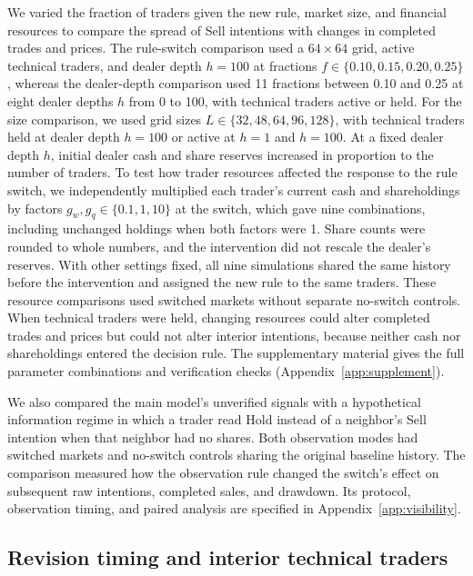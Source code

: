 We varied the fraction of traders given the new rule, market size, and
financial resources to compare the spread of Sell intentions with
changes in completed trades and prices. The rule-switch comparison used
a $64\times64$ grid, active technical traders, and dealer depth $h=100$
at fractions $f\in\{0.10,0.15,0.20,0.25\}$, whereas the dealer-depth
comparison used 11 fractions between 0.10 and 0.25 at eight dealer
depths $h$ from 0 to 100, with technical traders active or held. For the
size comparison, we used grid sizes $L\in\{32,48,64,96,128\}$, with
technical traders held at dealer depth $h=100$ or active at $h=1$ and
$h=100$. At a fixed dealer depth $h$, initial dealer cash and share
reserves increased in proportion to the number of traders. To test how
trader resources affected the response to the rule switch, we
independently multiplied each trader's current cash and shareholdings by
factors $g_w,g_q\in\{0.1,1,10\}$ at the switch, which gave nine
combinations, including unchanged holdings when both factors were 1.
Share counts were rounded to whole numbers, and the intervention did not
rescale the dealer's reserves. With other settings fixed, all nine
simulations shared the same history before the intervention and assigned
the new rule to the same traders. These resource comparisons used
switched markets without separate no-switch controls. When technical
traders were held,
changing resources could alter completed trades and prices but could not
alter interior intentions, because neither cash nor shareholdings
entered the decision rule. The supplementary material gives the full
parameter combinations and verification checks
(Appendix~\ref{app:supplement}).



We also compared the main model's unverified signals with a hypothetical
information regime in which a trader read Hold instead of a neighbor's
Sell intention when that neighbor had no shares. Both observation modes
had switched markets and no-switch controls sharing the original
baseline history. The comparison measured how the observation rule
changed the switch's effect on subsequent raw intentions, completed
sales, and drawdown. Its protocol, observation timing, and paired
analysis are specified in Appendix~\ref{app:visibility}.

\subsection{Revision timing and interior technical traders}

